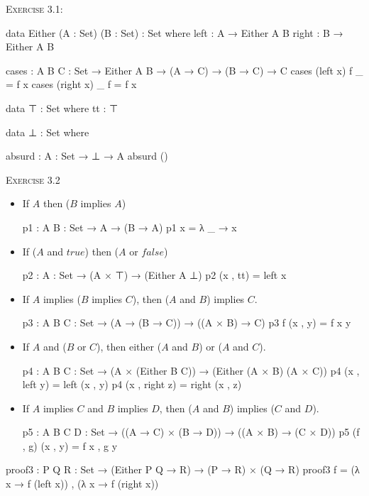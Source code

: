 \documentclass{article}
\begin{document}
\noindent
\textsc{Exercise 3.1}:

\begin{code}
data Either (A : Set) (B : Set) : Set where
    left : A → Either A B
    right : B → Either A B

cases : {A B C : Set} → Either A B → (A → C) → (B → C) → C
cases (left x) f _ = f x
cases (right x) _ f = f x
\end{code}

\begin{code}
data ⊤ : Set where
    tt : ⊤

data ⊥ : Set where

absurd : {A : Set} → ⊥ → A
absurd ()
\end{code}

\noindent
\textsc{Exercise 3.2}
\begin{itemize}
\item If $A$ then ($B$ implies $A$)
\begin{code}
p1 : {A B : Set} → A → (B → A)
p1 x = λ _ → x
\end{code}
\item If ($A$ and $\mathit{true}$) then ($A$ or $\mathit{false}$)
\begin{code}
p2 : {A : Set} → (A × ⊤) → (Either A ⊥)
p2 (x , tt) = left x
\end{code}
\item If $A$ implies ($B$ implies $C$), then ($A$ and $B$) implies $C$.
\begin{code}
p3 : {A B C : Set} → (A → (B → C)) → ((A × B) → C)
p3 f (x , y) = f x y
\end{code}
\item If $A$ and ($B$ or $C$), then either ($A$ and $B$) or ($A$ and $C$).
\begin{code}
p4 : {A B C : Set} → (A × (Either B C)) → (Either (A × B) (A × C))
p4 (x , left y) = left (x , y)
p4 (x , right z) = right (x , z)
\end{code}
\item If $A$ implies $C$ and $B$ implies $D$, then ($A$ and $B$) implies ($C$ and $D$).
\begin{code}
p5 : {A B C D : Set} → ((A → C) × (B → D)) → ((A × B) → (C × D))
p5 (f , g) (x , y) = f x , g y
\end{code}
\end{itemize}

\begin{code}
proof3 : {P Q R : Set} → (Either P Q → R) → (P → R) × (Q → R)
proof3 f = (λ x → f (left x)) , (λ x → f (right x))
\end{code}
\end{document}
